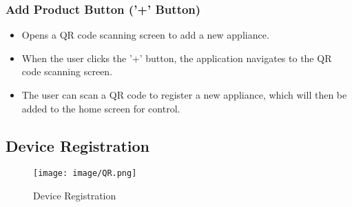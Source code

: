 \documentclass[conference]{IEEEtran}
\begin{document}
\subsubsection{Add Product Button ('+' Button)}
\begin{itemize}
    \item Opens a QR code scanning screen to add a new appliance.\\
    \item When the user clicks the '+' button, the application navigates to the QR code scanning screen.\\
    \item The user can scan a QR code to register a new appliance, which will then be added to the home screen for control.\\
\end{itemize}

\subsection{Device Registration}
\begin{figure}[h!]
    \centering
    \texttt{[image: image/QR.png]}
    \caption{Device Registration}
    \label{fig:enter-label}
\end{figure}
\end{document}
